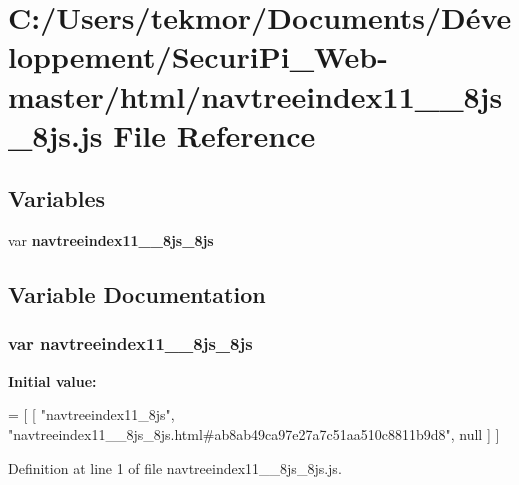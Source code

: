 \section{C\+:/\+Users/tekmor/\+Documents/\+Développement/\+Securi\+Pi\+\_\+\+Web-\/master/html/navtreeindex11\+\_\+\+\_\+8js\+\_\+8js.js File Reference}
\label{navtreeindex11____8js__8js_8js}
\subsection*{Variables}
\begin{DoxyCompactItemize}
\item 
var {\bf navtreeindex11\+\_\+\+\_\+8js\+\_\+8js}
\end{DoxyCompactItemize}


\subsection{Variable Documentation}
\subsubsection[{navtreeindex11\+\_\+\+\_\+8js\+\_\+8js}]{\setlength{\rightskip}{0pt plus 5cm}var navtreeindex11\+\_\+\+\_\+8js\+\_\+8js}\label{navtreeindex11____8js__8js_8js_a08e7499b52342e8842100e784f924cd6}
{\bfseries Initial value\+:}
\begin{DoxyCode}
=
[
    [ \textcolor{stringliteral}{"navtreeindex11\_8js"}, \textcolor{stringliteral}{"navtreeindex11\_\_8js\_8js.html#ab8ab49ca97e27a7c51aa510c8811b9d8"}, null ]
]
\end{DoxyCode}


Definition at line 1 of file navtreeindex11\+\_\+\+\_\+8js\+\_\+8js.\+js.

